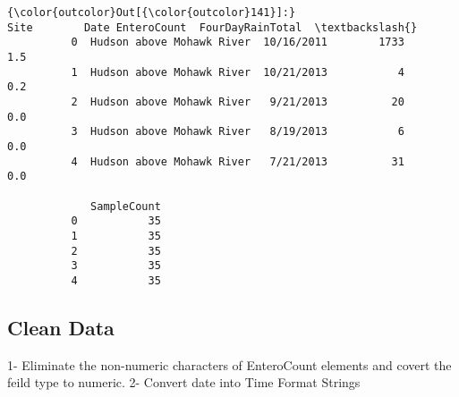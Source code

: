 \documentclass[11pt]{article}
\begin{document}
\begin{Verbatim}[commandchars=\\\{\}]
{\color{outcolor}Out[{\color{outcolor}141}]:}                         Site        Date EnteroCount  FourDayRainTotal  \textbackslash{}
          0  Hudson above Mohawk River  10/16/2011        1733               1.5   
          1  Hudson above Mohawk River  10/21/2013           4               0.2   
          2  Hudson above Mohawk River   9/21/2013          20               0.0   
          3  Hudson above Mohawk River   8/19/2013           6               0.0   
          4  Hudson above Mohawk River   7/21/2013          31               0.0   
          
             SampleCount  
          0           35  
          1           35  
          2           35  
          3           35  
          4           35  
\end{Verbatim}
            
    \subsection{Clean Data}\label{clean-data}

1- Eliminate the non-numeric characters of EnteroCount elements and
covert the feild type to numeric. 2- Convert date into Time Format
Strings
\end{document}
